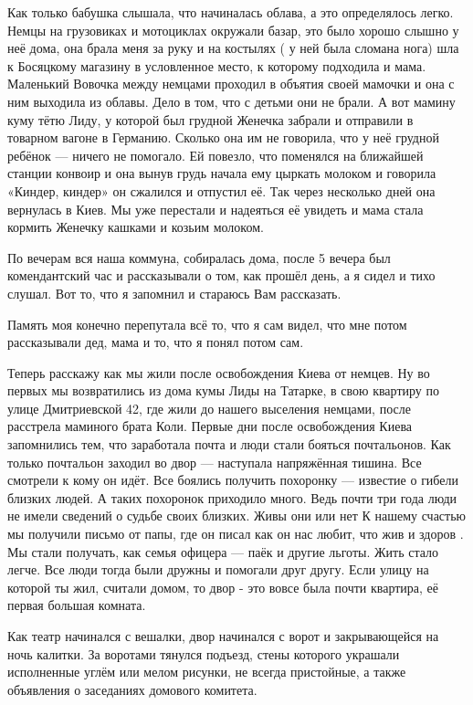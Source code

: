 Как только бабушка слышала, что
начиналась облава, а это определялось легко. Немцы на грузовиках и мотоциклах
окружали базар, это было хорошо слышно у неё дома, она брала меня за руку и на
костылях ( у ней была сломана нога) шла к Босяцкому магазину в условленное
место, к которому подходила и мама. Маленький Вовочка между немцами проходил в
объятия своей мамочки и она с ним выходила из облавы. Дело в том, что с детьми
они не брали. А вот мамину куму  тётю Лиду, у которой был грудной Женечка
забрали и отправили  в товарном вагоне в Германию. Сколько она им не говорила,
что у неё грудной ребёнок — ничего не помогало.  Ей повезло, что поменялся  на
ближайшей станции конвоир и она вынув грудь  начала ему цыркать  молоком и
говорила «Киндер, киндер» он  сжалился и отпустил её. Так через несколько дней
она вернулась в Киев.   Мы уже перестали и надеяться её увидеть и мама стала
кормить Женечку кашками и козьим молоком.

По вечерам вся  наша коммуна,  собиралась дома, после 5 вечера был
комендантский час и рассказывали о том, как прошёл день, а я сидел и тихо
слушал. Вот то, что я запомнил и стараюсь Вам рассказать.

Память моя конечно перепутала всё то, что я сам видел, что мне потом
рассказывали дед, мама и то, что я понял потом сам.

Теперь расскажу как мы жили после освобождения Киева от немцев. Ну во первых мы
возвратились из дома кумы Лиды на Татарке,   в свою квартиру по улице
Дмитриевской 42, где жили до нашего выселения немцами, после расстрела маминого
брата Коли.  Первые дни после освобождения Киева запомнились тем, что
заработала почта и люди стали бояться почтальонов. Как только почтальон заходил
во двор — наступала напряжённая тишина. Все смотрели к кому он  идёт. Все
боялись получить похоронку — известие о гибели близких людей. А таких похоронок
приходило много. Ведь почти три года люди не имели сведений о судьбе своих
близких. Живы они или нет К нашему счастью мы получили письмо от папы, где он
писал как он нас любит, что жив и здоров . Мы стали получать, как семья офицера
— паёк и другие льготы. Жить стало легче. Все люди тогда были дружны и помогали
друг другу. Если улицу на которой ты жил, считали домом, то двор  -  это вовсе
была почти квартира, её первая большая комната.

Как театр начинался с вешалки, двор начинался с ворот и закрывающейся на ночь
калитки. За воротами тянулся подъезд, стены которого  украшали исполненные
углём или мелом рисунки, не всегда пристойные, а также объявления о заседаниях
домового комитета. 

